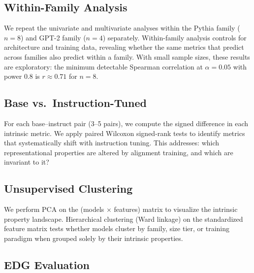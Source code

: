 \documentclass{article}
\begin{document}
\subsection{Within-Family Analysis}
\label{sec:within-family}

We repeat the univariate and multivariate analyses within the Pythia family ($n=8$) and GPT-2 family ($n=4$) separately.
Within-family analysis controls for architecture and training data, revealing whether the same metrics that predict across families also predict within a family.
With small sample sizes, these results are exploratory: the minimum detectable Spearman correlation at $\alpha = 0.05$ with power $0.8$ is $r \approx 0.71$ for $n = 8$.

\subsection{Base vs.\ Instruction-Tuned}
\label{sec:instruct}

For each base--instruct pair (3--5 pairs), we compute the signed difference in each intrinsic metric.
We apply paired Wilcoxon signed-rank tests to identify metrics that systematically shift with instruction tuning.
This addresses: which representational properties are altered by alignment training, and which are invariant to it?

\subsection{Unsupervised Clustering}
\label{sec:clustering}

We perform PCA on the (models $\times$ features) matrix to visualize the intrinsic property landscape.
Hierarchical clustering (Ward linkage) on the standardized feature matrix tests whether models cluster by family, size tier, or training paradigm when grouped solely by their intrinsic properties.

\subsection{EDG Evaluation}
\label{sec:edg-eval}
\end{document}
